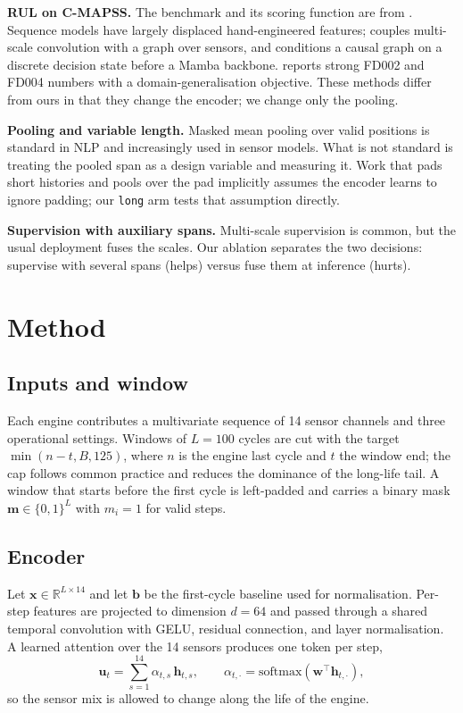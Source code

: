 \documentclass[journal,10pt]{IEEEtran}
\begin{document}
\textbf{RUL on C-MAPSS.} The benchmark and its scoring function are from
\cite{saxena2008}. Sequence models have largely displaced hand-engineered features;
\cite{mfssc2024} couples multi-scale convolution with a graph over sensors, and
\cite{ast2026} conditions a causal graph on a discrete decision state before a Mamba
backbone. \cite{dkdgjln2026} reports strong FD002 and FD004 numbers with a
domain-generalisation objective. These methods differ from ours in that they change
the encoder; we change only the pooling.

\textbf{Pooling and variable length.} Masked mean pooling over valid positions is
standard in NLP and increasingly used in sensor models. What is not standard is
treating the pooled span as a design variable and measuring it. Work that pads short
histories and pools over the pad implicitly assumes the encoder learns to ignore
padding; our \texttt{long} arm tests that assumption directly.

\textbf{Supervision with auxiliary spans.} Multi-scale supervision is common, but the
usual deployment fuses the scales. Our ablation separates the two decisions:
supervise with several spans (helps) versus fuse them at inference (hurts).

\section{Method}

\subsection{Inputs and window}
Each engine contributes a multivariate sequence of 14 sensor channels and three
operational settings. Windows of $L=100$ cycles are cut with the target
$\min(n-t,{B},125)$, where $n$ is the engine last cycle and $t$ the window end; the
cap follows common practice and reduces the dominance of the long-life tail. A
window that starts before the first cycle is left-padded and carries a binary mask
$\mathbf{m}\in\{0,1\}^{L}$ with $m_i=1$ for valid steps.

\subsection{Encoder}
Let $\mathbf{x}\in\mathbb{R}^{L\times 14}$ and let $\mathbf{b}$ be the first-cycle
baseline used for normalisation. Per-step features are projected to dimension
$d=64$ and passed through a shared temporal convolution with GELU, residual
connection, and layer normalisation. A learned attention over the 14 sensors
produces one token per step,
\begin{equation}
\mathbf{u}_t=\sum_{s=1}^{14}\alpha_{t,s}\,\mathbf{h}_{t,s},
\qquad
\alpha_{t,\cdot}=\mathrm{softmax}(\mathbf{w}^{\top}\mathbf{h}_{t,\cdot}),
\end{equation}
so the sensor mix is allowed to change along the life of the engine.
\end{document}
